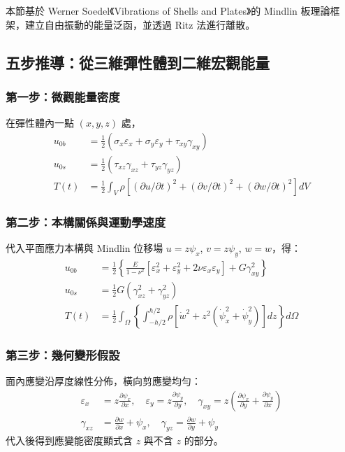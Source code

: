 本節基於 Werner Soedel《Vibrations of Shells and Plates》的 Mindlin 板理論框架，建立自由振動的能量泛函，並透過 Ritz 法進行離散。

\subsection{五步推導：從三維彈性體到二維宏觀能量}

\subsubsection{第一步：微觀能量密度}
在彈性體內一點 $(x,y,z)$ 處，
\begin{align}
u_{0b} &= \frac{1}{2} (\sigma_x \varepsilon_x + \sigma_y \varepsilon_y + \tau_{xy} \gamma_{xy}) \label{eq:u0b} \\
u_{0s} &= \frac{1}{2} (\tau_{xz} \gamma_{xz} + \tau_{yz} \gamma_{yz}) \label{eq:u0s} \\
T(t)  &= \frac{1}{2} \int_V \rho \left[ (\partial u/\partial t)^2 + (\partial v/\partial t)^2 + (\partial w/\partial t)^2 \right] dV \label{eq:T0}
\end{align}

\subsubsection{第二步：本構關係與運動學速度}
代入平面應力本構與 Mindlin 位移場 $u = z\psi_x$, $v = z\psi_y$, $w = w$，得：
\begin{align}
u_{0b} &= \frac{1}{2} \left\{ \frac{E}{1-\nu^2} [\varepsilon_x^2 + \varepsilon_y^2 + 2\nu \varepsilon_x \varepsilon_y] + G \gamma_{xy}^2 \right\} \\
u_{0s} &= \frac{1}{2} G (\gamma_{xz}^2 + \gamma_{yz}^2) \\
T(t)  &= \frac{1}{2} \int_\Omega \left\{ \int_{-h/2}^{h/2} \rho \left[ \dot{w}^2 + z^2 (\dot{\psi}_x^2 + \dot{\psi}_y^2) \right] dz \right\} d\Omega
\end{align}

\subsubsection{第三步：幾何變形假設}
面內應變沿厚度線性分佈，橫向剪應變均勻：
\begin{align}
\varepsilon_x &= z \frac{\partial \psi_x}{\partial x},\quad
\varepsilon_y = z \frac{\partial \psi_y}{\partial y},\quad
\gamma_{xy} = z \left( \frac{\partial \psi_x}{\partial y} + \frac{\partial \psi_y}{\partial x} \right) \\
\gamma_{xz} &= \frac{\partial w}{\partial x} + \psi_x,\quad
\gamma_{yz} = \frac{\partial w}{\partial y} + \psi_y
\end{align}
代入後得到應變能密度顯式含 $z$ 與不含 $z$ 的部分。

